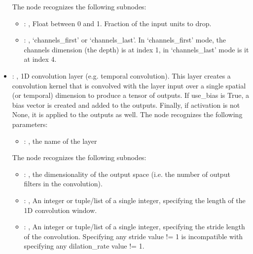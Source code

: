 \begin{itemize}
      The  node recognizes the following subnodes:
      \begin{itemize}
        \item {}: , 
          Float between 0 and 1. Fraction of the input units to drop.

        \item {}: , 
          `channels\_first' or `channels\_last'. In `channels\_first' mode, the channels dimension
          (the depth)         is at index 1, in `channels\_last' mode is it at index 4.
      \end{itemize}

    \item {}: , 
      1D convolution layer (e.g. temporal convolution). This layer creates a convolution kernel that
      is convolved with the layer input over a single spatial (or temporal) dimension to produce a
      tensor of outputs.         If use\_bias is True, a bias vector is created and added to the
      outputs. Finally, if activation is not None,         it is applied to the outputs as well.
      The  node recognizes the following parameters:
        \begin{itemize}
          \item {}: , 
            the name of the layer
      \end{itemize}

      The  node recognizes the following subnodes:
      \begin{itemize}
        \item {}: , 
          the dimensionality of the output space (i.e. the number of output filters in the
          convolution).

        \item {}: , 
          An integer or tuple/list of a single integer, specifying the length of the 1D convolution
          window.

        \item {}: , 
          An integer or tuple/list of a single integer, specifying the stride length of the
          convolution.         Specifying any stride value != 1 is incompatible with specifying any
          dilation\_rate value != 1.


\end{itemize}
\end{itemize}
